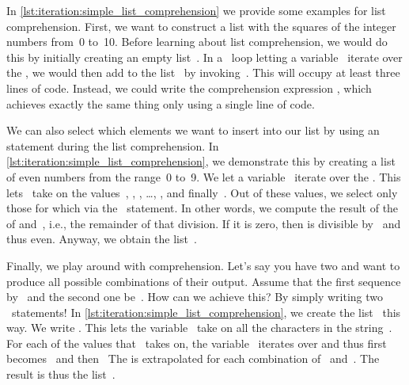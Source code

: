 %
In \cref{lst:iteration:simple_list_comprehension} we provide some examples for list comprehension.
First, we want to construct a list with the squares of the integer numbers from~0 to~10.
Before learning about list comprehension, we would do this by initially creating an empty list~.
In a ~loop letting a variable~ iterate over the , we would then add  to the list~ by invoking~.
This will occupy at least three lines of code.
Instead, we could write the comprehension expression , which achieves exactly the same thing only using a single line of code.

We can also select which elements we want to insert into our list by using an  statement during the list comprehension.
In \cref{lst:iteration:simple_list_comprehension}, we demonstrate this by creating a list of even numbers from the range~0 to~9.
We let a variable~ iterate over the .
This lets~ take on the values~, , , \dots, , and finally~.
Out of these values, we select only those for which  via the ~statement.
In other words, we compute the result of the  of  and~, i.e., the remainder of that division.
If it is zero, then  is divisible by~ and thus even.
Anyway, we obtain the list~\pythonil{[0, 2, 4, 6, 8]}.%
%
\begin{sloppypar}%
Finally, we play around with  comprehension.
Let's say you have two  and want to produce all possible combinations of their output.
Assume that the first sequence by~ and the second one be~.
How can we achieve this?
By simply writing two ~statements!
In \cref{lst:iteration:simple_list_comprehension}, we create the list~ this way.
We write .
This lets the variable~ take on all the characters in the string~.
For each of the values that~ takes on, the variable~ iterates over  and thus first becomes~ and then~
The   is extrapolated for each combination of~ and~.
The result is thus the list~\pythonil{["ax", "ay", "bx", "by", "cx", "cy"]}.%
\end{sloppypar}%
